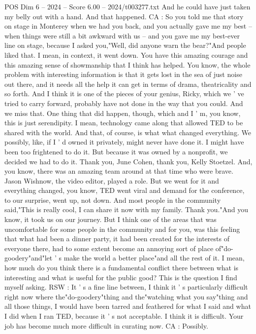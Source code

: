 \begin{textsample}{POS Dim 6 – 2024 – Score 6.00 – 2024/t003277.txt}
And he could have just taken my belly out with a hand.
And that happened.
CA : So you told me that story on stage in Monterey when we had you back, and you actually gave me my best -- when things were still a bit awkward with us -- and you gave me my best-ever line on stage, because I asked you,"Well, did anyone warn the bear?"And people liked that.
I mean, in context, it went down.
You have this amazing courage and this amazing sense of showmanship that I think has helped.
You know, the whole problem with interesting information is that it gets lost in the sea of just noise out there, and it needs all the help it can get in terms of drama, theatricality and so forth.
And I think it is one of the pieces of your genius, Ricky, which we ' ve tried to carry forward, probably have not done in the way that you could.
And we miss that.
One thing that did happen, though, which and I ' m, you know, this is just serendipity.
I mean, technology came along that allowed TED to be shared with the world.
And that, of course, is what what changed everything.
We possibly, like, if I ' d owned it privately, might never have done it.
I might have been too frightened to do it.
But because it was owned by a nonprofit, we decided we had to do it.
Thank you, June Cohen, thank you, Kelly Stoetzel.
And, you know, there was an amazing team around at that time who were brave.
Jason Wishnow, the video editor, played a role.
But we went for it and everything changed, you know, TED went viral and demand for the conference, to our surprise, went up, not down.
And most people in the community said,"This is really cool, I can share it now with my family.
Thank you."And you know, it took us on our journey.
But I think one of the areas that was uncomfortable for some people in the community and for you, was this feeling that what had been a dinner party, it had been created for the interests of everyone there, had to some extent become an annoying sort of place of"do-goodery"and"let ' s make the world a better place"and all the rest of it.
I mean, how much do you think there is a fundamental conflict there between what is interesting and what is useful for the public good?
This is the question I find myself asking.
RSW : It ' s a fine line between, I think it ' s particularly difficult right now where the"do-goodery"thing and the"watching what you say"thing and all those things, I would have been tarred and feathered for what I said and what I did when I ran TED, because it ' s not acceptable.
I think it is difficult.
Your job has become much more difficult in curating now.
CA : Possibly.

\end{textsample}
